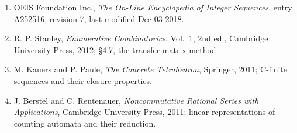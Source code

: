 \documentclass[11pt]{article}
\theoremstyle{definition}
\begin{document}
\begin{enumerate}

\item OEIS Foundation Inc., \emph{The On-Line Encyclopedia of Integer Sequences}, entry \href{https://oeis.org/A252516}{A252516}, revision 7, last modified Dec 03 2018.

\item R. P. Stanley, \emph{Enumerative Combinatorics}, Vol.~1, 2nd ed., Cambridge University Press, 2012; \S4.7, the transfer-matrix method.

\item M. Kauers and P. Paule, \emph{The Concrete Tetrahedron}, Springer, 2011; C-finite sequences and their closure properties.

\item J. Berstel and C. Reutenauer, \emph{Noncommutative Rational Series with Applications}, Cambridge University Press, 2011; linear representations of counting automata and their reduction.

\end{enumerate}
\end{document}

